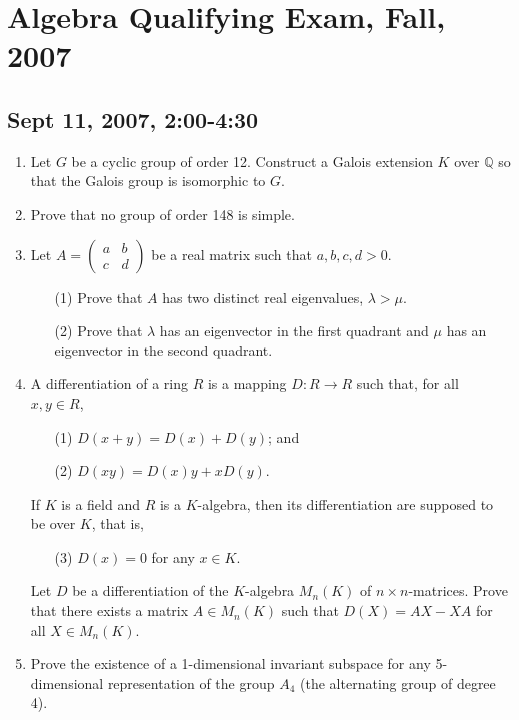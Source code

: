\documentclass{article}
\begin{document}
\section*{Algebra Qualifying Exam, Fall, 2007}
\subsection*{Sept 11, 2007, 2:00-4:30}

\begin{enumerate}
    \item Let \(G\) be a cyclic group of order 12. Construct a Galois extension \(K\) over \(\mathbb{Q}\) so that the Galois group is isomorphic to \(G\).

    \item Prove that no group of order 148 is simple.

    \item Let \(A = \begin{pmatrix} a & b \\ c & d \end{pmatrix}\) be a real matrix such that \(a,b,c,d > 0\).
    \begin{itemize}
        \item[(1)] Prove that \(A\) has two distinct real eigenvalues, \(\lambda > \mu\).
        \item[(2)] Prove that \(\lambda\) has an eigenvector in the first quadrant and \(\mu\) has an eigenvector in the second quadrant.
    \end{itemize}

    \item A differentiation of a ring \(R\) is a mapping \(D : R \to R\) such that, for all \(x,y \in R\),
    \begin{itemize}
        \item[(1)] \(D(x+y) = D(x) + D(y)\); and
        \item[(2)] \(D(xy) = D(x)y + xD(y)\).
    \end{itemize}
    If \(K\) is a field and \(R\) is a \(K\)-algebra, then its differentiation are supposed to be over \(K\), that is,
    \begin{itemize}
        \item[(3)] \(D(x) = 0\) for any \(x \in K\).
    \end{itemize}
    Let \(D\) be a differentiation of the \(K\)-algebra \(M_n(K)\) of \(n \times n\)-matrices. Prove that there exists a matrix \(A \in M_n(K)\) such that \(D(X) = AX - XA\) for all \(X \in M_n(K)\).

    \item Prove the existence of a 1-dimensional invariant subspace for any 5-dimensional representation of the group \(A_4\) (the alternating group of degree 4).
\end{enumerate}
\end{document}
